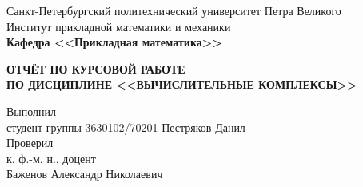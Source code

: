 \documentclass[main.tex]{subfiles}
\begin{document}
\begin{titlepage}
\begin{center}
	\begin{large}
		Санкт-Петербургский политехнический университет Петра Великого\\
		Институт прикладной математики и механики\\
		\textbf{Кафедра <<Прикладная математика>>}\\
	\end{large}
	\vfill
	\Large{\textbf{ОТЧЁТ ПО КУРСОВОЙ РАБОТЕ\\
	ПО ДИСЦИПЛИНЕ <<ВЫЧИСЛИТЕЛЬНЫЕ КОМПЛЕКСЫ>>}}
\end{center}
\vfill
\flushleft
Выполнил\\
студент группы 3630102/70201
\flushright
Пестряков Данил\\
\flushleft
Проверил\\
к. ф.-м. н., доцент\\
\flushright
Баженов Александр Николаевич
\vfill
{}
\end{titlepage}
\end{document}
